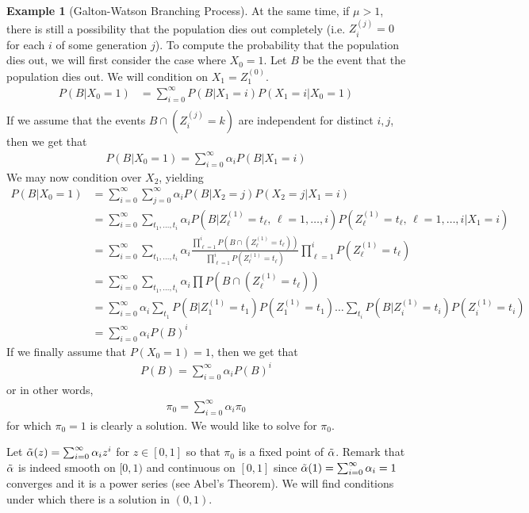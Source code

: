 \documentclass[11pt]{amsart}
\theoremstyle{definition}
\newtheorem{example}[theorem]{Example}
\numberwithin{equation}{section}
\begin{document}
\begin{example}[Galton-Watson Branching Process]
 At the same time, if $\mu>1$, there is still a possibility that the population dies out completely (i.e. $Z_{i}^{(j)}=0$ for each $i$ of some generation $j$). To compute the probability that the population dies out, we will first consider the case where $X_0=1$. Let $B$ be the event that the population dies out. We will condition on $X_1=Z_1^{(0)}$.
 \begin{align*}
     P(B|X_0=1)&=\sum_{i=0}^\infty P(B|X_1=i)P(X_1=i|X_0=1)\\
 \end{align*}
 If we assume that the events $B\cap (Z_i^{(j)}=k)$ are independent for distinct $i,j$, then we get that
 \begin{align*}
     P(B|X_0=1)=\sum_{i=0}^\infty \alpha_iP(B|X_1=i)
 \end{align*}
 We may now condition over $X_2$, yielding
 \begin{align*}
     P(B|X_0=1)&=\sum_{i=0}^\infty\sum_{j=0}^\infty\alpha_iP(B|X_2=j)P(X_2=j|X_1=i)\\
     &=\sum_{i=0}^\infty\sum_{t_1,\ldots,t_i} \alpha_iP(B|Z_{\ell}^{(1)}=t_\ell,\,\ell=1,\ldots,i)P(Z_{\ell}^{(1)}=t_\ell,\,\ell=1,\ldots,i|X_1=i)\\
     &=\sum_{i=0}^\infty\sum_{t_1,\ldots,t_i}\alpha_i\frac{\prod_{\ell=1}^i P(B\cap (Z_\ell^{(1)}=t_\ell))}{\prod_{\ell=1}^iP(Z_\ell^{(1)}=t_\ell)}\prod_{\ell=1}^iP(Z_\ell^{(1)}=t_\ell)\\
     &=\sum_{i=0}^\infty\sum_{t_1,\ldots,t_i}\alpha_i\prod P(B\cap(Z_\ell^{(1)}=t_\ell))\\
     &=\sum_{i=0}^\infty\alpha_i\sum_{t_1}P(B|Z_1^{(1)}=t_1)P(Z_1^{(1)}=t_1)\ldots\sum_{t_i}P(B|Z_i^{(1)}=t_i)P(Z_i^{(1)}=t_i)\\
     &=\sum_{i=0}^\infty\alpha_iP(B)^i
 \end{align*}
 If we finally assume that $P(X_0=1)=1$, then we get that
 \begin{align*}
     P(B)=\sum_{i=0}^\infty\alpha_iP(B)^i
 \end{align*}
 or in other words,
 \begin{align*}
     \pi_0=\sum_{i=0}^\infty \alpha_i\pi_0
 \end{align*}
 for which $\pi_0=1$ is clearly a solution. We would like to solve for $\pi_0$.

 Let $\Tilde{\alpha}(z)=\sum_{i=0}^\infty\alpha_iz^i$ for $z\in[0,1]$ so that $\pi_0$ is a fixed point of $\Tilde{\alpha}$. Remark that $\Tilde{\alpha}$ is indeed smooth on $[0,1)$ and continuous on $[0,1]$ since $\Tilde{\alpha}(1)=\sum_{i=0}^\infty\alpha_i=1$ converges and it is a power series (see Abel's Theorem). We will find conditions under which there is a solution in $(0,1)$.


\end{example}
\end{document}
